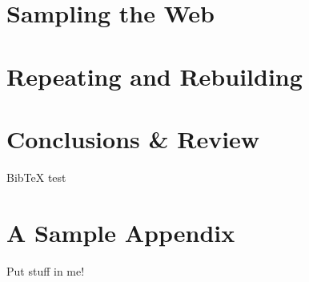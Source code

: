 \documentclass[11pt,oneside,a4paper,onecolumn,titlepage,draft]{lancsthesis}
\begin{document}
\chapter{Sampling the Web}



\chapter{Repeating and Rebuilding}



\chapter{Conclusions \& Review}


BibTeX test \cite{Ahlberg94visualinformation}


\pagebreak

\backmatter



\pagebreak
\appendix
{}


\chapter{A Sample Appendix}
Put stuff in me!


\end{document}
